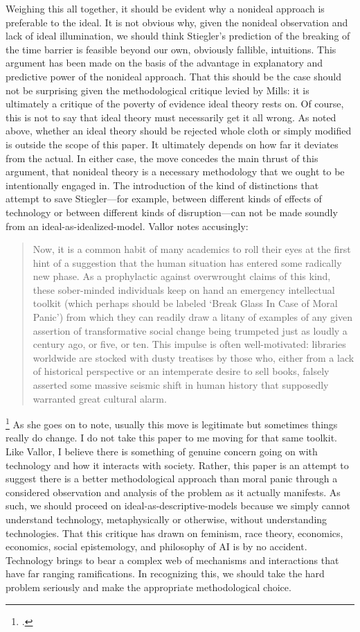 \documentclass[letterpaper,notitlepage,12pt]{article}
\begin{document}
Weighing this all together, it should be evident why a nonideal approach is
preferable to the ideal.
It is not obvious why, given the nonideal observation and lack of ideal
illumination, we should think Stiegler's prediction of the breaking of the time
barrier is feasible beyond our own, obviously fallible, intuitions.
This argument has been made on the basis of the advantage in explanatory and
predictive power of the nonideal approach.
That this should be the case should not be surprising given the methodological
critique levied by Mills: it is ultimately a critique of the poverty of evidence
ideal theory rests on.
Of course, this is not to say that ideal theory must necessarily get it all
wrong.
As noted above, whether an ideal theory should be rejected whole cloth or simply
modified is outside the scope of this paper.
It ultimately depends on how far it deviates from the actual.
In either case, the move concedes the main thrust of this argument, that
nonideal theory is a necessary methodology that we ought to be intentionally
engaged in.
The introduction of the kind of distinctions that attempt to save
Stiegler---for example, between different kinds of effects of technology or
between different kinds of disruption---can not be made soundly from an
ideal-as-idealized-model.
Vallor notes accusingly:\blockquote{Now, it is a
common habit of many academics to roll their eyes at the first hint of a 
suggestion that the human situation has entered some radically new phase. As a 
prophylactic against overwrought claims of this kind, these sober-minded 
individuals keep on hand an emergency intellectual toolkit (which perhaps should
be labeled ‘Break Glass In Case of Moral Panic’) from which they can readily 
draw a litany of examples of any given assertion of transformative social change 
being trumpeted just as loudly a century ago, or five, or ten. This impulse is 
often well-motivated: libraries worldwide are stocked with dusty treatises by 
those who, either from a lack of historical perspective or an intemperate desire
to sell books, falsely asserted some massive seismic shift in human history that
supposedly warranted great cultural alarm.}\footcite[p.
9]{vallor_technology_2018}
As she goes on to note, usually this move is legitimate but sometimes things
really do change. I do not take this paper to me moving for that same toolkit.
Like Vallor, I believe there is something of genuine concern going on with
technology and how it interacts with society. Rather, this paper is an attempt
to suggest there is a better methodological approach than moral panic through a
considered observation and analysis of the problem as it actually manifests.
As such, we should proceed on ideal-as-descriptive-models because we simply
cannot understand technology, metaphysically or otherwise, without understanding
technologies.
That this critique has drawn on feminism, race theory, economics, economics,
social epistemology, and philosophy of AI is by no accident.
Technology brings to bear a complex web of mechanisms and interactions that have
far ranging ramifications.
In recognizing this, we should take the hard problem seriously and make the
appropriate methodological choice.


\nocite{searle_minds_1980}
\nocite{block_psychologism_1981}

\printbibliography
\end{document}

